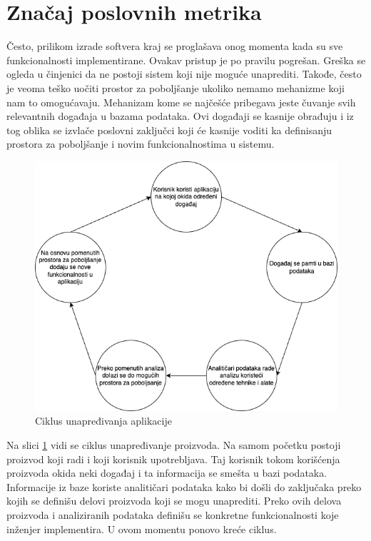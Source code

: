 \documentclass[12pt,oneside]{memoir}
\begin{document}
\section{Značaj poslovnih metrika}

Često, prilikom izrade softvera kraj se proglašava onog momenta kada su sve funkcionalnosti implementirane. Ovakav pristup je po pravilu pogrešan. Greška se ogleda u činjenici da ne postoji sistem koji nije moguće unaprediti. Takođe, često je veoma teško uočiti prostor za poboljšanje ukoliko nemamo mehanizme koji nam to omogućavaju. Mehanizam kome se najčešće pribegava jeste čuvanje svih relevantnih događaja u bazama podataka\cite{dataAnalytics}. Ovi događaji se kasnije obrađuju i iz tog oblika se izvlače poslovni zaključci koji će kasnije voditi ka definisanju prostora za poboljšanje i novim funkcionalnostima u sistemu.

\begin{figure}[h!]
\centering
\includegraphics[scale=0.5]{docs/images/chapterSix/dataFlow.png}
\caption{Ciklus unapređivanja aplikacije}
\label{fig:dataFlow}
\end{figure}

Na slici \ref{fig:dataFlow} vidi se ciklus unapređivanje proizvoda. Na samom početku postoji proizvod koji radi i koji korisnik upotrebljava. Taj korisnik tokom korišćenja proizvoda okida neki događaj i ta informacija se smešta u bazi podataka. Informacije iz baze koriste analitičari podataka kako bi došli do zaključaka preko kojih se definišu delovi proizvoda koji se mogu unaprediti. Preko ovih delova proizvoda i analiziranih podataka definišu se konkretne funkcionalnosti koje inženjer implementira. U ovom momentu ponovo kreće ciklus.
\end{document}
